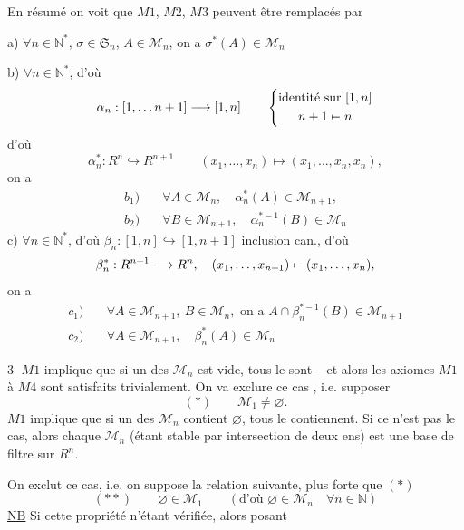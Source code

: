 En résumé on voit que $M1$, $M2$, $M3$ peuvent être remplacés par

a)  $\forall n\in\mathbb N^{*}$, $\sigma\in\mathfrak S_n$, $A\in\mathcal M_n$, on a $\sigma^*(A)\in\mathcal M_n$

b) $\forall n\in\mathbb N^*$, d'où
\[
\alpha_n:[1,\ldots n+1]\longrightarrow[1,n]\qquad
\left\{\begin{gathered}\text{identité sur }[1,n]\\ n+1\mathrel{\mapstochar\relbar}n\end{gathered}\right.
\]
d'où 
\[
\alpha_n^*:R^n\hookrightarrow R^{n+1}\qquad(x_1,\ldots,x_n)\longmapsto(x_1,\ldots,x_n,x_n),
\]
on a
\[
\begin{aligned}
b_1)\quad&\forall A\in\mathcal M_n,\quad\alpha_n^*(A)\in\mathcal M_{n+1},\\
b_2)\quad&\forall B\in\mathcal M_{n+1},\quad\alpha_n^{*-1}(B)\in\mathcal M_n
\end{aligned}
\]
c) $\forall n\in\mathbb N^*$, d'où $\beta_n:[1,n]\hookrightarrow[1,n+1]$ inclusion can., d'où
\[
\beta_n^*:R^{n+1}\longrightarrow R^n,\quad(x_1,\ldots,x_{n+1})\mathrel{\mapstochar\relbar}(x_1,\ldots,x_n),
\]
on a
\[
\begin{aligned}
c_1)\quad&\forall A\in\mathcal M_{n+1},\ B\in\mathcal M_n,\text{ on a }A\cap\beta_n^{*-1}(B)\in\mathcal M_{n+1}\\
c_2)\quad&\forall A\in\mathcal M_{n+1},\quad\beta_n^*(A)\in\mathcal M_n
\end{aligned}
\]

\textcircled{3} $M1$ implique que si un des $\mathcal M_n$ est vide, tous le sont -- et alors les axiomes $M1$ à $M4$ sont satisfaits trivialement. On va exclure ce cas , i.e. supposer
\[
(*)\qquad\mathcal M_1\ne\varnothing.
\]
$M1$ implique que si un des $\mathcal M_n$ contient $\varnothing$, tous le contiennent. Si ce n'est pas le cas, alors chaque $\mathcal M_n$ (étant stable par intersection de deux ens) est une base de filtre sur $R^n$.

On exclut ce cas, i.e. on suppose la relation suivante, plus forte que $(*)$
\[
(**)\qquad\varnothing\in\mathcal M_1\qquad(\text{d'où }\varnothing\in\mathcal M_n\quad\forall n\in\mathbb N)
\]
\uline{NB} Si cette propriété n'étant vérifiée, alors posant
